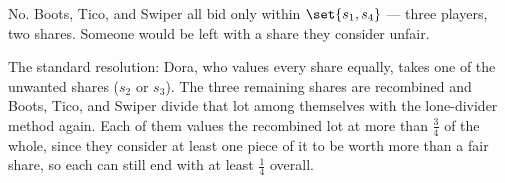 \documentclass[12pt]{ximera}
\begin{document}
\begin{problem}
\begin{prompt}
\begin{multipleChoice}
\end{multipleChoice}

\begin{feedback}
No. Boots, Tico, and Swiper all bid only within $\set{s_1,s_4}$ --- three players, two
shares. Someone would be left with a share they consider unfair.

The standard resolution: Dora, who values every share equally, takes one of the
unwanted shares ($s_2$ or $s_3$). The three remaining shares are recombined and Boots,
Tico, and Swiper divide that lot among themselves with the lone-divider method again.
Each of them values the recombined lot at more than $\frac34$ of the whole, since they
consider at least one piece of it to be worth more than a fair share, so each can still
end with at least $\frac14$ overall.
\end{feedback}
\end{prompt}
\end{problem}
\end{document}
